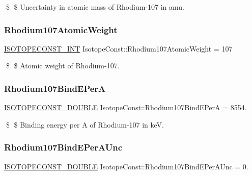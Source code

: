 \$ \$ Uncertainty in atomic mass of Rhodium-\/107 in amu. \mbox{\label{group___isotope_const-_rhodium-_rh107_ga9ba42f0745c0462ab0721287812b0b91}} 
\subsubsection{\texorpdfstring{Rhodium107\+Atomic\+Weight}{Rhodium107AtomicWeight}}
{\footnotesize\ttfamily \mbox{\hyperlink{group___isotope_const-_macros_ga5f18360b3e99483a35c32d789e62621c}{I\+S\+O\+T\+O\+P\+E\+C\+O\+N\+S\+T\+\_\+\+I\+NT}} Isotope\+Const\+::\+Rhodium107\+Atomic\+Weight = 107}

\$ \$ Atomic weight of Rhodium-\/107. \mbox{\label{group___isotope_const-_rhodium-_rh107_ga34a687c5969e555a92392d10f618b44f}} 
\subsubsection{\texorpdfstring{Rhodium107\+Bind\+E\+PerA}{Rhodium107BindEPerA}}
{\footnotesize\ttfamily \mbox{\hyperlink{group___isotope_const-_macros_ga8f45a7272ce02c0b4c65c44636ed719a}{I\+S\+O\+T\+O\+P\+E\+C\+O\+N\+S\+T\+\_\+\+D\+O\+U\+B\+LE}} Isotope\+Const\+::\+Rhodium107\+Bind\+E\+PerA = 8554.}

\$ \$ Binding energy per A of Rhodium-\/107 in keV. \mbox{\label{group___isotope_const-_rhodium-_rh107_gaf10d45d7a4e7c0b54d741e332db766c6}} 
\subsubsection{\texorpdfstring{Rhodium107\+Bind\+E\+Per\+A\+Unc}{Rhodium107BindEPerAUnc}}
{\footnotesize\ttfamily \mbox{\hyperlink{group___isotope_const-_macros_ga8f45a7272ce02c0b4c65c44636ed719a}{I\+S\+O\+T\+O\+P\+E\+C\+O\+N\+S\+T\+\_\+\+D\+O\+U\+B\+LE}} Isotope\+Const\+::\+Rhodium107\+Bind\+E\+Per\+A\+Unc = 0.}

